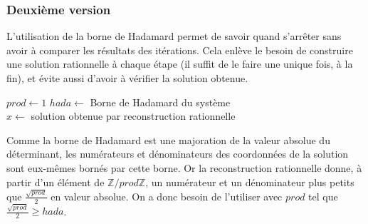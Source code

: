 \documentclass[french]{article}
\begin{document}
\subsubsection{Deuxième version}
L'utilisation de la borne de Hadamard permet de savoir quand s'arrêter sans avoir à comparer les résultats des itérations. Cela enlève le besoin de construire une solution rationnelle à chaque étape (il suffit de le faire une unique fois, à la fin), et évite aussi d'avoir à vérifier la solution obtenue.
 \newline
\begin{algorithm}[H]
	\DontPrintSemicolon
	$prod \gets 1$
	$hada \gets$ Borne de Hadamard du système\\
	$x \gets$ solution obtenue par reconstruction rationnelle
\end{algorithm}
\leavevmode \newline
Comme la borne de Hadamard est une majoration de la valeur absolue du déterminant, les numérateurs et dénominateurs des coordonnées de la solution sont eux-mêmes bornés par cette borne. Or la reconstruction rationnelle donne, à partir d'un élément de $\mathbb{Z}/prod\mathbb{Z}$, un numérateur et un dénominateur plus petits que $\frac{\sqrt{prod}}{2}$ en valeur absolue. On a donc besoin de l'utiliser avec $prod$ tel que $\frac{\sqrt{prod}}{2} \geq hada$.
\end{document}
